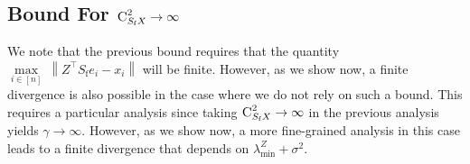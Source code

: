 \documentclass[11pt]{article}
\theoremstyle{definition}
\theoremstyle{plain}
\newcommand{\Norm}[1]{\left\| #1 \right\|}
\providecommand{\norm}[1]{\Norm{#1}}
\begin{document}
\subsection{Bound For $\textsc{C}^2_{S_{\mathrm{f}}X} \to \infty$}
\label{app:guarantee_CFX_infinity}
We note that the previous bound requires that the quantity $\underset{i\in [n]}{\max} \ \norm{Z^{\top}S_{\mathrm{f}}e_i - x_i}$ will be finite. However, as we show now, a finite divergence is also possible in the case where we do not rely on such a bound. This requires a particular analysis since taking $\textsc{C}^2_{S_{\mathrm{f}}X}\to \infty$ in the previous analysis yields $\gamma \to \infty$. However, as we show now, a more fine-grained analysis in this case leads to a finite divergence that depends on $\lambda^{Z}_{\min} + \sigma^2$. 
\end{document}
